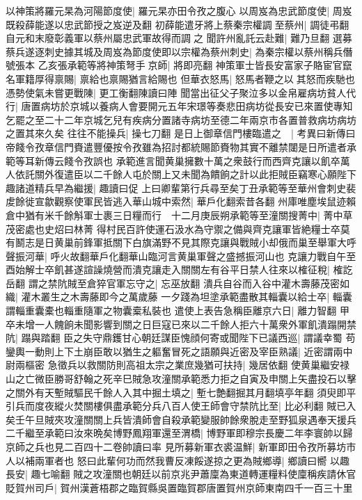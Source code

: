 以神策將羅元杲為河陽節度使|{
	羅元杲亦田令孜之腹心}
以周岌為忠武節度使|{
	周岌既殺薛能遂以忠武節授之岌逆及翻}
初薛能遣牙將上蔡秦宗權調至蔡州|{
	調徒弔翻自元和末廢彰義軍以蔡州屬忠武軍故得而調之}
聞許州亂託云赴難|{
	難乃旦翻}
選募蔡兵遂逐刺史據其城及周岌為節度使即以宗權為蔡州刺史|{
	為秦宗權以蔡州稱兵僭號張本}
乙亥張承範等將神策弩手京師|{
	將即亮翻}
神策軍士皆長安富家子賂宦官竄名軍籍厚得禀賜|{
	禀給也禀賜猶言給賜也}
但華衣怒馬|{
	怒馬者鞭之以其怒而疾馳也}
憑勢使氣未嘗更戰陳|{
	更工衡翻陳讀曰陣}
聞當出征父子聚泣多以金帛雇病坊貧人代行|{
	唐置病坊於京城以養病人會要開元五年宋璟等奏悲田病坊從長安已來置使專知乞罷之至二十二年京城乞兒有疾病分置諸寺病坊至德二年兩京市各置普救病坊病坊之置其來久矣}
往往不能操兵|{
	操七刀翻}
是日上御章信門樓臨遣之　|{
	考異曰新傳曰帝餞令孜章信門賚遣豐優按令孜雖為招討都統賜節賚物其實不離禁闥是日所遣者承範等耳新傳云餞令孜誤也}
承範進言聞黄巢擁數十萬之衆鼓行而西齊克讓以飢卒萬人依託關外復遣臣以二千餘人屯於關上又未聞為饋餉之計以此拒賊臣竊寒心願陛下趣諸道精兵早為繼援|{
	趣讀曰促}
上曰卿輩第行兵尋至矣丁丑承範等至華州會刺史裴䖍餘徙宣歙觀察使軍民皆逃入華山城中索然|{
	華戶化翻索昔各翻}
州庫唯塵埃鼠迹賴倉中猶有米千餘斛軍士裹三日糧而行　十二月庚辰朔承範等至潼關搜菁中|{
	菁中草茂密處也史炤曰林菁}
得村民百許使運石汲水為守禦之備與齊克讓軍皆絶糧士卒莫有鬭志是日黄巢前鋒軍抵關下白旗滿野不見其際克讓與戰賊小却俄而巢至舉軍大呼聲振河華|{
	呼火故翻華戶化翻華山臨河言黄巢軍聲之盛撼振河山也}
克讓力戰自午至酉始解士卒飢甚遂諠譟燒營而潰克讓走入關關左有谷平日禁人往來以榷征稅|{
	榷訖岳翻}
謂之禁阬賊至倉猝官軍忘守之|{
	忘巫放翻}
潰兵自谷而入谷中灌木壽藤茂密如織|{
	灌木叢生之木壽藤即今之萬歲藤}
一夕踐為坦塗承範盡散其輜囊以給士卒|{
	輜囊謂輜重囊橐也輜重隨軍之物囊槖私裝也}
遣使上表告急稱臣離京六日|{
	離力智翻}
甲卒未增一人餽餉未聞影響到關之日巨寇已來以二千餘人拒六十萬衆外軍飢潰蹋開禁阬|{
	蹋與踏翻}
臣之失守鼎鑊甘心朝廷謀臣愧顔何寄或聞陛下已議西巡|{
	謂議幸蜀}
苟鑾輿一動則上下土崩臣敢以猶生之軀奮冒死之語願與近密及宰臣熟議|{
	近密謂兩中尉兩樞密}
急徵兵以救關防則高祖太宗之業庶幾猶可扶持|{
	幾居依翻}
使黄巢繼安禄山之亡微臣勝哥舒翰之死辛巳賊急攻潼關承範悉力拒之自寅及申關上矢盡投石以擊之關外有天塹賊驅民千餘人入其中掘土填之|{
	塹七艶翻掘其月翻填亭年翻}
須臾即平引兵而度夜縱火焚關樓俱盡承範分兵八百人使王師會守禁阬比至|{
	比必利翻}
賊已入矣壬午旦賊夾攻潼關關上兵皆潰師會自殺承範變服帥餘衆脫走至野狐泉遇奉天援兵二千繼至承範曰汝來晩矣博野鳳翔軍還至渭橋|{
	博野軍即穆宗長慶二年李寰帥以歸京師之兵也見二百四十二卷帥讀曰率}
見所募新軍衣裘温鮮|{
	新軍即田令孜所募坊市人以補兩軍者也}
怒曰此輩何功而然我曹反凍餒遂掠之更為賊鄉導|{
	鄉讀曰嚮}
以趣長安|{
	趣七喻翻}
賊之攻潼關也朝廷以前京兆尹蕭廩為東道轉運糧料使廩稱疾請休官貶賀州司戶|{
	賀州漢蒼梧郡之臨賀縣吳置臨賀郡唐置賀州京師東南四千一百三十里}
